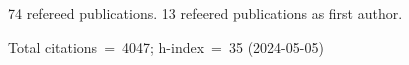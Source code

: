 74 refereed publications. 13 refeered publications as first author.

Total citations~=~4047; h-index~=~35 (2024-05-05)